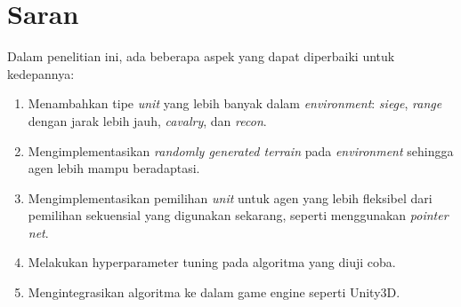 \section{Saran}
\label{chap:saran}

Dalam penelitian ini, ada beberapa aspek yang dapat diperbaiki untuk kedepannya:

\begin{enumerate}[nolistsep]

  \item Menambahkan tipe \emph{unit} yang lebih banyak dalam \emph{environment}: \emph{siege}, \emph{range}
  dengan jarak lebih jauh, \emph{cavalry}, dan \emph{recon}.

  \item Mengimplementasikan \emph{randomly generated terrain} pada \emph{environment} sehingga agen lebih
  mampu beradaptasi.

  \item Mengimplementasikan pemilihan \emph{unit} untuk agen yang lebih fleksibel dari pemilihan sekuensial
  yang digunakan sekarang, seperti menggunakan \emph{pointer net}.

  \item Melakukan hyperparameter tuning pada algoritma yang diuji coba.
  
  \item Mengintegrasikan algoritma ke dalam game engine seperti Unity3D.

\end{enumerate}
